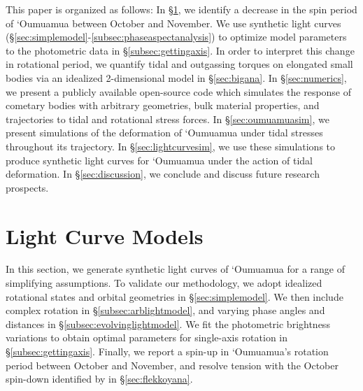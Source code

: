 \documentclass[twocolumn,doublespacing]{aastex631}
\begin{document}
This paper is organized as follows: In \S \ref{sec:lightcurvefits}, we identify a decrease in the spin period of `Oumuamua between October and November. We use synthetic light curves (\S\ref{sec:simplemodel}-\ref{subsec:phaseaspectanalysis}) to optimize model parameters to the photometric data in \S\ref{subsec:gettingaxis}. In order to interpret this change in rotational period, we quantify tidal and outgassing torques on elongated small bodies via an idealized 2-dimensional model in \S \ref{sec:bigana}. In \S \ref{sec:numerics}, we present a publicly available open-source code which simulates the response of cometary bodies with arbitrary geometries, bulk material properties, and trajectories to tidal and rotational stress forces. In \S \ref{sec:oumuamuasim}, we present simulations of the deformation of `Oumuamua under tidal stresses throughout its trajectory. In \S \ref{sec:lightcurvesim}, we use these simulations to produce synthetic light curves for `Oumuamua under the action of tidal deformation. In \S \ref{sec:discussion}, we conclude and discuss future research prospects. 

\section{Light Curve Models}\label{sec:lightcurvefits}

In this section, we generate synthetic light curves of `Oumuamua for a range of simplifying assumptions. To validate our methodology, we adopt idealized rotational states and orbital geometries in \S\ref{sec:simplemodel}. We then include complex rotation in \S\ref{subsec:arblightmodel}, and varying phase angles and distances in \S\ref{subsec:evolvinglightmodel}. We fit the photometric brightness variations to obtain optimal parameters for single-axis rotation in \S\ref{subsec:gettingaxis}. Finally, we report a spin-up in `Oumuamua's rotation period between October and November, and resolve tension with the October spin-down identified by \citet{flekkoy2019} in \S\ref{sec:flekkoyana}.
\end{document}
